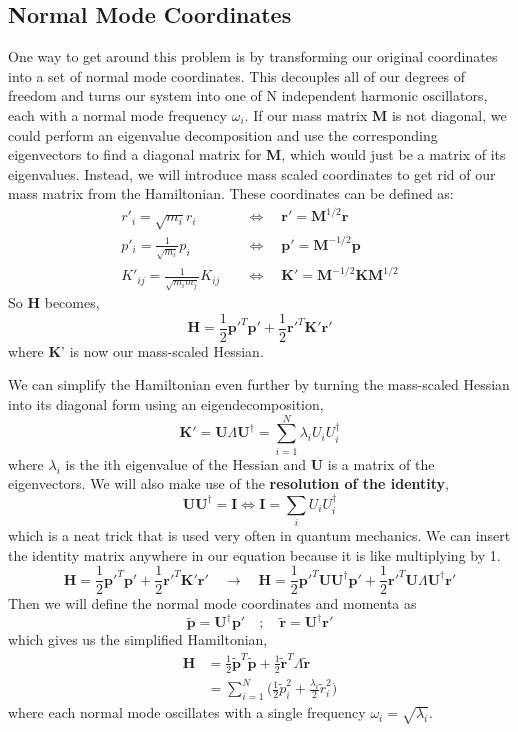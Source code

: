 \documentclass{article}
\newcommand{\be}{\begin{equation}}
\newcommand{\ee}{\end{equation}}
\newcommand{\br}{\textbf{r}}
\newcommand{\bp}{\textbf{p}}
\newcommand{\bm}{\textbf{M}}
\newcommand{\bk}{\textbf{K}}
\begin{document}
\subsection{Normal Mode Coordinates}
One way to get around this problem is by transforming our original coordinates into a set of normal mode coordinates.
This decouples all of our degrees of freedom and turns our system into one of N independent harmonic oscillators, each with a normal mode frequency $\omega_i$.
If our mass matrix \textbf{M} is not diagonal, we could perform an eigenvalue decomposition and use the corresponding eigenvectors to find a diagonal matrix for \bm, which would just be a matrix of its eigenvalues.
Instead, we will introduce mass scaled coordinates to get rid of our mass matrix from the Hamiltonian.
These coordinates can be defined as:
\be
  \begin{split}
    r'_i = \sqrt{m_i} r_i \quad &\Longleftrightarrow \quad \br' = \bm^{1/2} \br \\
    p'_i = \frac{1}{\sqrt{m_i}} p_i \quad &\Longleftrightarrow \quad \bp' = \bm^{-1/2} \bp \\
    K'_{i j} = \frac{1}{\sqrt{m_i m_j}} K_{i j} \quad &\Longleftrightarrow \quad \bk' = \bm^{-1/2} \bk \bm^{1/2}
  \end{split}
\ee
So \textbf{H} becomes,
\be
  \textbf{H} = \frac{1}{2} \bp'^T \bp' + \frac{1}{2} \br'^T \bk' \br'
\ee
where \bk' is now our mass-scaled Hessian.

We can simplify the Hamiltonian even further by turning the mass-scaled Hessian into its diagonal form using an eigendecomposition,
\be
  \bk' = \textbf{U} \Lambda \textbf{U}^{\dagger} = \sum_{i = 1}^N \lambda_i U_i U_i^{\dagger}
\ee
where $\lambda_i$ is the ith eigenvalue of the Hessian and \textbf{U} is a matrix of the eigenvectors.
We will also make use of the \textbf{resolution of the identity},
\be
  \textbf{U} \textbf{U}^{\dagger} = \textbf{I} \Longleftrightarrow \textbf{I} = \sum_i U_i U_i^{\dagger}
\ee
which is a neat trick that is used very often in quantum mechanics.
We can insert the identity matrix anywhere in our equation because it is like multiplying by 1.
\be
  \textbf{H} = \frac{1}{2} \bp'^T \bp' + \frac{1}{2} \br'^T \bk' \br' \quad \longrightarrow \quad \textbf{H} = \frac{1}{2} \bp'^T \textbf{U} \textbf{U}^{\dagger} \bp' + \frac{1}{2} \br'^T \textbf{U} \Lambda \textbf{U}^{\dagger} \br'
\ee
Then we will define the normal mode coordinates and momenta as
\be
  \tilde{\bp} = \textbf{U}^{\dagger} \bp' \quad ; \quad \tilde{\br} = \textbf{U}^{\dagger} \br'
\ee
which gives us the simplified Hamiltonian,
\be
  \begin{split}
    \textbf{H} &= \frac{1}{2} \tilde{\bp}^T \tilde{\bp} + \frac{1}{2} \tilde{\br}^T \Lambda \tilde{\br} \\
    &= \sum_{i=1}^{N} \Big( \frac{1}{2} \tilde{p}_i^2 + \frac{\lambda_i}{2} \tilde{r}_i^2 \Big)
  \end{split}
\ee
where each normal mode oscillates with a single frequency $\omega_i = \sqrt{\lambda_i}$.
\end{document}
